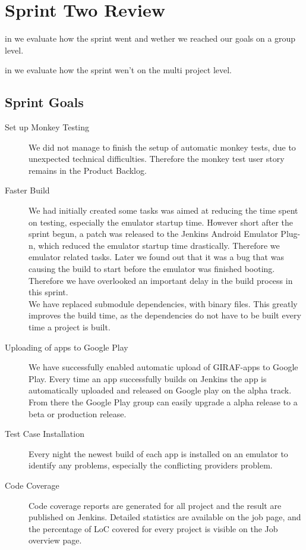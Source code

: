 \chapter{Sprint Two Review}\label{chap:sprint2_end}

\begin{chapterorganization}
  \item in  we evaluate how the sprint went and wether we reached our goals on a group level.
  \item in  we evaluate how the sprint wen't on the multi project level.
\end{chapterorganization}

\section{Sprint Goals}\label{sec:s2_goals}
\begin{description}
    \item[Set up Monkey Testing] We did not manage to finish the setup of automatic monkey tests, due to unexpected technical difficulties. Therefore the monkey test user story remains in the Product Backlog.
    \item[Faster Build] We had initially created some tasks was aimed at reducing the time spent on testing, especially the emulator startup time. However short after the sprint begun, a patch was released to the Jenkins Android Emulator Plug-n, which reduced the emulator startup time drastically. Therefore we emulator related tasks. Later we found out that it was a bug that was causing the build to start before the emulator was finished booting. Therefore we have overlooked an important delay in the build process in this sprint. \\
    We have replaced submodule dependencies, with binary files. This greatly improves the build time, as the dependencies do not have to be built every time a project is built. 
    \item[Uploading of apps to Google Play] We have successfully enabled automatic upload of GIRAF-apps to Google Play. Every time an app successfully builds on Jenkins the app is automatically uploaded and released on Google play on the alpha track. From there the Google Play group can easily upgrade a alpha release to a beta or production release.
    \item[Test Case Installation] Every night the newest build of each app is installed on an emulator to identify any problems, especially the conflicting providers problem.
    \item[Code Coverage] Code coverage reports are generated for all project and the result are published on Jenkins. Detailed statistics are available on the job page, and the percentage of LoC covered for every project is visible on the Job overview page. 
\end{description}

